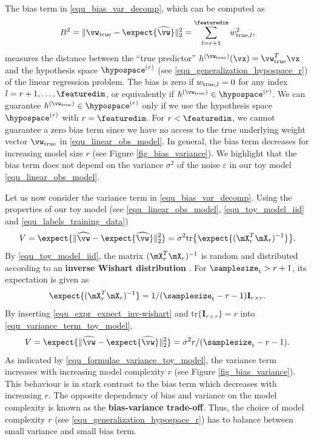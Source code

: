 \documentclass[12pt]{report}
\begin{document}
The bias term in \eqref{equ_bias_var_decomp}, which can be computed as 
\vspace*{-3mm}
\begin{equation}
\label{equ_def_bias_term}
B^{2} = \| \vw_{\rm true} - \expect \{ \widehat{\vw} \} \|^{2}_{2} = \sum_{l=r+1}^{\featuredim} w_{{\rm true},l}^2, 
\end{equation} 
measures the distance between the ``true predictor'' $h^{(\vw_{\rm true})}(\vx)=\vw_{\rm true}^{T} \vx$ and the 
hypothesis space $\hypospace^{(r)}$ (see \eqref{equ_generalization_hypospace_r}) of the linear regression problem. 
The bias is zero if $w_{{\rm true},l}=0$ for any index $l=r+1,\ldots,\featuredim$, or equivalently if $h^{(\vw_{\rm true})} \in \hypospace^{(r)}$. 
We can guarantee $h^{(\vw_{\rm true})} \in \hypospace^{(r)}$ only if we 
use the hypothesis space $\hypospace^{(r)}$ with $r=\featuredim$. 
For $r < \featuredim$, we cannot guarantee a zero bias term since we 
have no access to the true underlying weight vector $\vw_{\rm true}$ 
in \eqref{equ_linear_obs_model}. In general, the bias term decreases for 
increasing model size $r$ (see Figure \ref{fig_bias_variance}). We 
highlight that the bias term does not depend on the variance 
$\sigma^{2}$ of the noise $\varepsilon$ in our toy model \eqref{equ_linear_obs_model}. 

Let us now consider the variance term in \eqref{equ_bias_var_decomp}. 
Using the properties of our toy model (see \eqref{equ_linear_obs_model}, 
\eqref{equ_toy_model_iid} and \eqref{equ_labels_training_data})
\begin{equation}
\label{equ_variance_term_toy_model}
V = \expect \{ \| \widehat{\vw} - \expect\{ \widehat{\vw} \} \|^{2}_{2} \} = \sigma^{2} \mbox{tr} \big\{ \expect\{(\mX_{r}^{T} \mX_{r})^{-1} \} \big\}.
\end{equation} 
By \eqref{equ_toy_model_iid}, the matrix $(\mX_{r}^{T} \mX_{r})^{-1}$ is 
random and distributed according to an {\bf inverse Wishart distribution} \cite{Mardia1979}. 
For $\samplesize_{\rm t} > r +1$, its expectation is given as 
\begin{equation} 
\label{equ_expr_expect_inv-wishart}
\expect\{(\mX_{r}^{T} \mX_{r})^{-1} \} = 1/(\samplesize_{\rm t}-r-1) \mathbf{I}_{r \times r}.
\end{equation} 
By inserting \eqref{equ_expr_expect_inv-wishart} and $\mbox{tr} \{ \mathbf{I}_{r \times r} \} = r$ into \eqref{equ_variance_term_toy_model}, 
\begin{equation} 
\label{equ_formulae_variance_toy_model}
V= \expect \{ \| \widehat{\vw} - \expect\{ \widehat{\vw} \} \|^{2}_{2} \} = \sigma^{2} r/(\samplesize_{\rm t}-r-1). 
\end{equation} 
As indicated by \eqref{equ_formulae_variance_toy_model}, the 
variance term increases with increasing model complexity $r$ 
(see Figure \ref{fig_bias_variance}). This behaviour is in stark 
contrast to the bias term which decreases with increasing $r$. 
The opposite dependency of bias and variance on the model 
complexity is known as the {\bf bias-variance trade-off}. Thus, 
the choice of model complexity $r$ (see \eqref{equ_generalization_hypospace_r}) 
has to balance between small variance and small bias term. 
\end{document}
